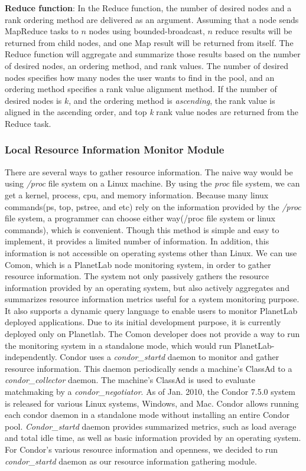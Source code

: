 \documentclass{acm_proc_article-sp}
\begin{document}
\textbf{Reduce function}: In the Reduce function, the number of desired nodes and a rank ordering method are delivered as an argument.
Assuming that a node sends MapReduce tasks to $n$ nodes using bounded-broadcast, \begin{math}n\end{math} reduce results will be returned from child nodes, 
and one Map result will be returned from itself. The Reduce function will aggregate and summarize those results based on the number of desired nodes, an ordering method, and rank values. 
The number of desired nodes specifies how many nodes the user wants to find in the pool, and an ordering method specifies a rank value alignment method. 
If the number of desired nodes is $k$, and the ordering method is \textit{ascending}, the rank value is aligned in the ascending order, and top \textit{k} rank value nodes are returned from the Reduce task.

\subsubsection{Local Resource Information Monitor Module}
There are several ways to gather resource information. The naive way would be using \textit{/proc} file system on a Linux machine. 
By using the \textit{proc} file system, we can get a kernel, process, cpu, and memory information. 
Because many linux commands(ps, top, pstree, and etc) rely on the information provided by the \textit{/proc} file system,  
a programmer can choose either way(/proc file system or linux commands), which is convenient. 
Though this method is simple and easy to implement, it provides a limited number of information. In addition, this information is not accessible on operating systems other than Linux.
We can use Comon\cite{comon}, which is a PlanetLab\cite{planetlab} node monitoring system, in order to gather resource information. The system not only passively gathers the resource information
provided by an operating system, but also actively aggregates and summarizes resource information metrics useful for a system monitoring purpose. 
It also supports a dynamic query language to enable users to monitor PlanetLab deployed applications.
Due to its initial development purpose, it is currently deployed only on Planetlab. The Comon developer does not provide a way to run the monitoring system in a standalone mode, which would run PlanetLab-independently. 
Condor\cite{condor} uses a \textit{condor\_startd} daemon to monitor and gather resource information. 
This daemon periodically sends a machine's ClassAd\cite{classad} to a \textit{condor\_collector} daemon. 
The machine's ClassAd is used to evaluate matchmaking by a \textit{condor\_negotiator}. 
As of Jan. 2010, the Condor 7.5.0 system is released for various Linux systems, Windows, and Mac. Condor allows running each condor daemon in a standalone mode without
installing an entire Condor pool. \textit{Condor\_startd} daemon provides summarized metrics, such as load average and total idle time, as well as basic information provided by an operating system.
For Condor's various resource information and openness, we decided to run \textit{condor\_startd} daemon as our resource information gathering module.
\end{document}
